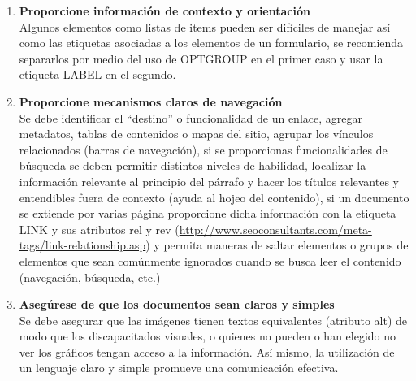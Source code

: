 \begin{enumerate}
	\item \textbf{Proporcione información de contexto y orientación}\\ Algunos elementos como listas de items pueden ser difíciles de manejar así como las etiquetas asociadas a los elementos de un formulario, se recomienda separarlos por medio del uso de OPTGROUP en el primer caso y usar la etiqueta LABEL en el segundo.
	\item \textbf{Proporcione mecanismos claros de navegación}\\ Se debe identificar el ``destino'' o funcionalidad de un enlace, agregar metadatos, tablas de contenidos o mapas del sitio, agrupar los vínculos relacionados (barras de navegación), si se proporcionas funcionalidades de búsqueda se deben permitir distintos niveles de habilidad, localizar la información relevante al principio del párrafo y hacer los títulos relevantes y entendibles fuera de contexto (ayuda al hojeo del contenido), si un documento se extiende por varias página proporcione dicha información con la etiqueta LINK y sus atributos rel y rev (\url{http://www.seoconsultants.com/meta-tags/link-relationship.asp}) y permita maneras de saltar elementos o grupos de elementos que sean comúnmente ignorados cuando se busca leer el contenido (navegación, búsqueda, etc.)
	\item \textbf{Asegúrese de que los documentos sean claros y simples}\\ Se debe asegurar que las imágenes tienen textos equivalentes (atributo alt) de modo que los discapacitados visuales, o quienes no pueden o han elegido no ver los gráficos tengan acceso a la información. Así mismo, la utilización de un lenguaje claro y simple promueve una comunicación efectiva.
\end{enumerate}
